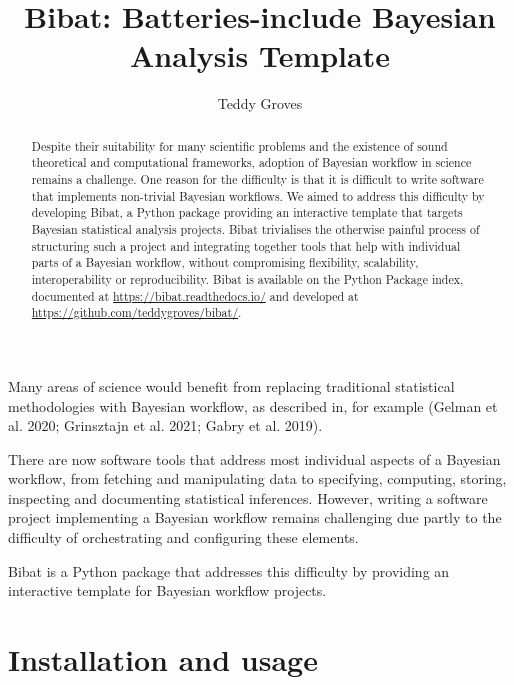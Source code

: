 \documentclass[
  letterpaper,
  DIV=11,
  numbers=noendperiod]{scrartcl}
\title{Bibat: Batteries-include Bayesian Analysis Template}
\author{Teddy Groves}
\date{}
\begin{document}
\maketitle
\begin{abstract}
Despite their suitability for many scientific problems and the existence
of sound theoretical and computational frameworks, adoption of Bayesian
workflow in science remains a challenge. One reason for the difficulty
is that it is difficult to write software that implements non-trivial
Bayesian workflows. We aimed to address this difficulty by developing
Bibat, a Python package providing an interactive template that targets
Bayesian statistical analysis projects. Bibat trivialises the otherwise
painful process of structuring such a project and integrating together
tools that help with individual parts of a Bayesian workflow, without
compromising flexibility, scalability, interoperability or
reproducibility. Bibat is available on the Python Package index,
documented at \url{https://bibat.readthedocs.io/} and developed at
\url{https://github.com/teddygroves/bibat/}.
\end{abstract}
\ifdefined\Shaded\renewenvironment{Shaded}{\begin{tcolorbox}[boxrule=0pt, sharp corners, enhanced, breakable, interior hidden, borderline west={3pt}{0pt}{shadecolor}, frame hidden]}{\end{tcolorbox}}\fi

Many areas of science would benefit from replacing traditional
statistical methodologies with Bayesian workflow, as described in, for
example (Gelman et al. 2020; Grinsztajn et al. 2021; Gabry et al. 2019).

There are now software tools that address most individual aspects of a
Bayesian workflow, from fetching and manipulating data to specifying,
computing, storing, inspecting and documenting statistical inferences.
However, writing a software project implementing a Bayesian workflow
remains challenging due partly to the difficulty of orchestrating and
configuring these elements.

Bibat is a Python package that addresses this difficulty by providing an
interactive template for Bayesian workflow projects.

\hypertarget{installation-and-usage}{%
\section{Installation and usage}\label{installation-and-usage}}
\end{document}
